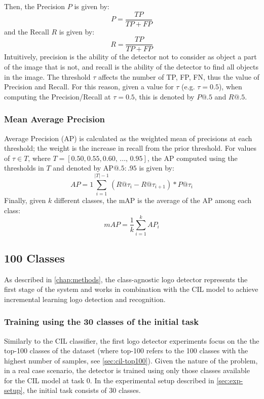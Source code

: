 Then, the Precision $P$ is given by:
\begin{equation} %
    P = \frac{TP}{TP + FP}
\end{equation}
and the Recall $R$ is given by:
\begin{equation} %
    R = \frac{TP}{TP + FP}
\end{equation}
Intuitively, precision is the ability of the detector not to consider as object a part of the image that is not, and recall is the ability of the detector to find all objects in the image.
The threshold $\tau$ affects the number of TP, FP, FN, thus the value of Precision and Recall. For this reason, given a value for $\tau$ (e.g. $\tau = 0.5$), when computing the Precision/Recall at $\tau = 0.5$, this is denoted by $P@.5$ and $R@.5$.

\subsubsection{Mean Average Precision}
Average Precision (AP) is calculated as the weighted mean of precisions at each threshold; the weight is the increase in recall from the prior threshold. For values of $\tau \in T$, where $T = [0.50, 0.55, 0.60,\, ..., \, 0.95 ]$, the AP computed using the thresholds in $T$ and denoted by $\text{AP}@.5:.95$ is given by:
\begin{equation}
    AP = 1 \sum_{i=1}^{|T| - 1}(R@\tau_i - R@\tau_{i+1} ) * P@\tau_{i}
\end{equation}
Finally, given $k$ different classes, the mAP is the average of the AP among each class:
\begin{equation}
    mAP = \frac{1}{k} \sum_{i=1}^{k} AP_i
\end{equation}

\subsection{100 Classes}

As described in \autoref{chap:methods}, the class-agnostic logo detector represents the first stage of the system and works in combination with the CIL model to achieve incremental learning logo detection and recognition.

\subsubsection{Training using the 30 classes of the initial task}
Similarly to the CIL classifier, the first logo detector experiments focus on the the top-100 classes of the dataset (where top-100 refers to the 100 classes with the highest number of samples, see \autoref{sec:cil-top100}).
Given the nature of the problem, in a real case scenario, the detector is trained using only those classes available for the CIL model at task 0. In the experimental setup described in \autoref{sec:exp-setup}, the initial task consists of 30 classes.

